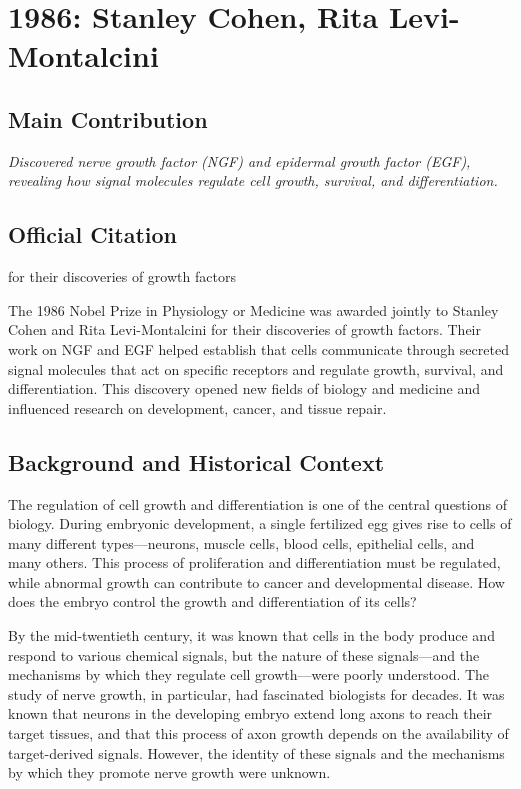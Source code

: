 \chapter[1986 --- Cohen et al.]{1986: Stanley Cohen, Rita Levi-Montalcini}
\label{ch:1986_Cohen}

\section*{Main Contribution}

\textit{Discovered nerve growth factor (NGF) and epidermal growth factor (EGF), revealing how signal molecules regulate cell growth, survival, and differentiation.}\cite{nobel-1986,lecture-1986}

\section{Official Citation}

for their discoveries of growth factors

The 1986 Nobel Prize in Physiology or Medicine was awarded jointly to Stanley Cohen and Rita Levi-Montalcini for their discoveries of growth factors. Their work on NGF and EGF helped establish that cells communicate through secreted signal molecules that act on specific receptors and regulate growth, survival, and differentiation. This discovery opened new fields of biology and medicine and influenced research on development, cancer, and tissue repair.

\section{Background and Historical Context}

The regulation of cell growth and differentiation is one of the central questions of biology. During embryonic development, a single fertilized egg gives rise to cells of many different types---neurons, muscle cells, blood cells, epithelial cells, and many others. This process of proliferation and differentiation must be regulated, while abnormal growth can contribute to cancer and developmental disease. How does the embryo control the growth and differentiation of its cells?

By the mid-twentieth century, it was known that cells in the body produce and respond to various chemical signals, but the nature of these signals---and the mechanisms by which they regulate cell growth---were poorly understood. The study of nerve growth, in particular, had fascinated biologists for decades. It was known that neurons in the developing embryo extend long axons to reach their target tissues, and that this process of axon growth depends on the availability of target-derived signals. However, the identity of these signals and the mechanisms by which they promote nerve growth were unknown.

